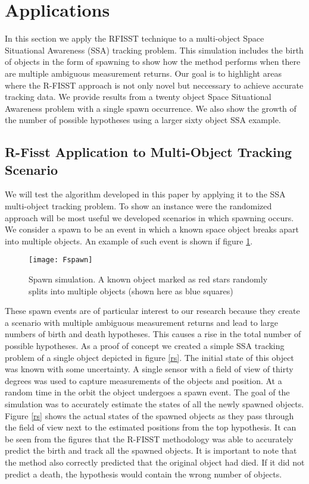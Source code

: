 \documentclass[10pt, conference]{IEEEtran}
\begin{document}
\section{Applications}
In this section we apply the RFISST technique to a multi-object Space Situational Awareness (SSA) tracking problem. This simulation includes the birth of objects in the form of spawning to show how the method performs when there are multiple ambiguous measurement returns. Our goal is to highlight areas where the R-FISST approach is not only novel but neccessary to achieve accurate tracking data. We provide results from a twenty object Space Situational Awareness problem with a single spawn occurrence. We also show the growth of the number of possible hypotheses using a larger sixty object SSA example.

\subsection{R-Fisst Application to Multi-Object Tracking Scenario}
We will test the algorithm developed in this paper by applying it to the SSA multi-object tracking problem. To show an instance were the randomized approach will be most useful we developed scenarios in which spawning occurs. We consider a spawn to be an event in which a known space object breaks apart into multiple objects. An example of such event is shown if figure \ref{Spawn}.

\begin{figure}[h]
\centering
\texttt{[image: Fspawn]}
\caption{Spawn simulation. A known object marked as red stars randomly splits into multiple objects (shown here as blue squares)}
\label{Spawn}
\end{figure}

These spawn events are of particular interest to our research because they create a scenario with multiple ambiguous measurement returns and lead to large numbers of birth and death hypotheses. This causes a rise in the total number of possible hypotheses. As a proof of concept we created a simple SSA tracking problem of a single object depicted in figure \ref{rs}. The initial state of this object was known with some uncertainty. A single sensor with a field of view of thirty degrees was used to capture measurements of the objects  and  position. At a random time in the orbit the object undergoes a spawn event. The goal of the simulation was to accurately estimate the states of all the newly spawned objects. Figure \ref{rs} shows the actual states of the spawned objects as they pass through the field of view next to the estimated positions from the top hypothesis. It can be seen from the figures that the R-FISST methodology was able to accurately predict the birth and track all the spawned objects. It is important to note that the method also correctly predicted that the original object had died. If it did not predict a death, the hypothesis would contain the wrong number of objects.
\end{document}
